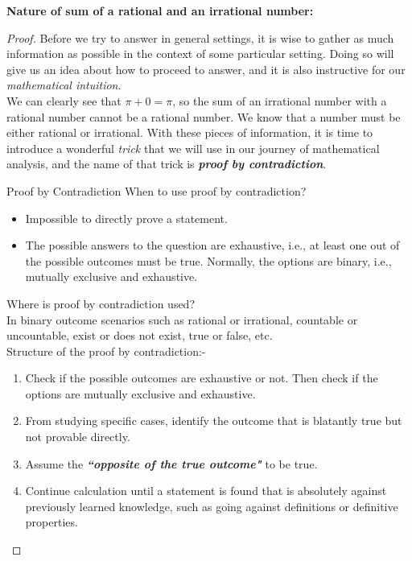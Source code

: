 \newline
\textbf{Nature of sum of a rational and an irrational number:}
\begin{proof}
    Before we try to answer in general settings, it is wise to gather as much information as possible in the context of some particular setting. Doing so will give us an idea about how to proceed to answer, and it is also instructive for our \textit{mathematical intuition}.\\
    We can clearly see that $\pi+0=\pi$, so the sum of an irrational number with a rational number cannot be a rational number. We know that a number must be either rational or irrational. With these pieces of information, it is time to introduce a wonderful \textit{trick} that we will use in our journey of mathematical analysis, and the name of that trick is \textit{\textbf{proof by contradiction}}. \\
    \begin{Trick}{Proof by Contradiction}
        When to use proof by contradiction?
            \begin{itemize}
                \item Impossible to directly prove a statement.
                \item The possible answers to the question are exhaustive, i.e., at least one out of the possible outcomes must be true. Normally, the options are binary, i.e., mutually exclusive and exhaustive.
            \end{itemize}
        \smallskip
        Where is proof by contradiction used?\\
        In binary outcome scenarios such as rational or irrational, countable or uncountable, exist or does not exist, true or false, etc.\\
        \newline
        Structure of the proof by contradiction:-
        \begin{enumerate}
            \item Check if the possible outcomes are exhaustive or not. Then check if the options are mutually exclusive and exhaustive.
            \item From studying specific cases, identify the outcome that is blatantly true but not provable directly.
            \item Assume the \textbf{\textit{``opposite of the true outcome"}} to be true.
            \item Continue calculation until a statement is found that is absolutely against previously learned knowledge, such as going against definitions or definitive properties.

\end{enumerate}
\end{Trick}
\end{proof}
